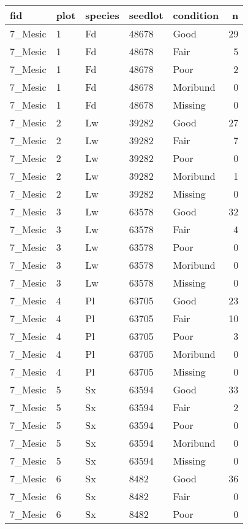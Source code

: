 \documentclass[
]{article}
\begin{document}
\begin{tabular}{l|l|l|l|l|r}
\hline
fid & plot & species & seedlot & condition & n\\
\hline
7\_Mesic & 1 & Fd & 48678 & Good & 29\\
\hline
7\_Mesic & 1 & Fd & 48678 & Fair & 5\\
\hline
7\_Mesic & 1 & Fd & 48678 & Poor & 2\\
\hline
7\_Mesic & 1 & Fd & 48678 & Moribund & 0\\
\hline
7\_Mesic & 1 & Fd & 48678 & Missing & 0\\
\hline
7\_Mesic & 2 & Lw & 39282 & Good & 27\\
\hline
7\_Mesic & 2 & Lw & 39282 & Fair & 7\\
\hline
7\_Mesic & 2 & Lw & 39282 & Poor & 0\\
\hline
7\_Mesic & 2 & Lw & 39282 & Moribund & 1\\
\hline
7\_Mesic & 2 & Lw & 39282 & Missing & 0\\
\hline
7\_Mesic & 3 & Lw & 63578 & Good & 32\\
\hline
7\_Mesic & 3 & Lw & 63578 & Fair & 4\\
\hline
7\_Mesic & 3 & Lw & 63578 & Poor & 0\\
\hline
7\_Mesic & 3 & Lw & 63578 & Moribund & 0\\
\hline
7\_Mesic & 3 & Lw & 63578 & Missing & 0\\
\hline
7\_Mesic & 4 & Pl & 63705 & Good & 23\\
\hline
7\_Mesic & 4 & Pl & 63705 & Fair & 10\\
\hline
7\_Mesic & 4 & Pl & 63705 & Poor & 3\\
\hline
7\_Mesic & 4 & Pl & 63705 & Moribund & 0\\
\hline
7\_Mesic & 4 & Pl & 63705 & Missing & 0\\
\hline
7\_Mesic & 5 & Sx & 63594 & Good & 33\\
\hline
7\_Mesic & 5 & Sx & 63594 & Fair & 2\\
\hline
7\_Mesic & 5 & Sx & 63594 & Poor & 0\\
\hline
7\_Mesic & 5 & Sx & 63594 & Moribund & 0\\
\hline
7\_Mesic & 5 & Sx & 63594 & Missing & 0\\
\hline
7\_Mesic & 6 & Sx & 8482 & Good & 36\\
\hline
7\_Mesic & 6 & Sx & 8482 & Fair & 0\\
\hline
7\_Mesic & 6 & Sx & 8482 & Poor & 0\\

\end{tabular}
\end{document}
